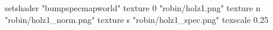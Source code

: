 setshader "bumpspecmapworld"
   texture 0 "robin/holz1.png"
   texture n "robin/holz1_norm.png"
   texture s "robin/holz1_spec.png"
texscale 0.25